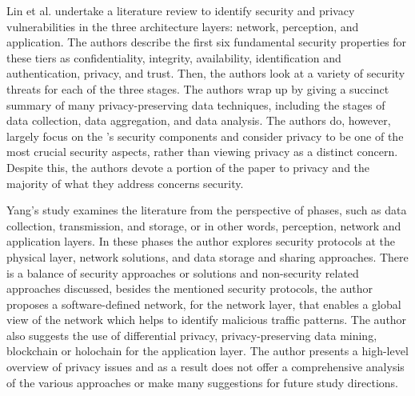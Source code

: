 Lin et al. \cite{LinSurvey} undertake a literature review to identify security
and privacy vulnerabilities in the three \hyperlink{\acronym}{\acronym} architecture layers: network,
perception, and application. The authors describe the first six fundamental
security properties for these tiers as confidentiality, integrity, availability,
identification and authentication, privacy, and trust. Then, the authors
look at a variety of security threats for each of the three stages. The
authors wrap up by giving a succinct summary of many privacy-preserving
data techniques, including the stages of data collection, data aggregation,
and data analysis. The authors do, however, largely focus on the \hyperlink{\acronym}{\acronym}'s security
components and consider privacy to be one of the most crucial security aspects,
rather than viewing privacy as a distinct concern. Despite this, the authors
devote a portion of the paper to privacy and the majority of what they address
concerns security.

Yang's study \cite{yang2022overview} examines the literature from the perspective
of \hyperlink{\acronym}{\acronym} phases, such as data collection, transmission, and storage, or in other
words, perception, network and application layers. In these phases the author explores
security protocols at the physical layer, network solutions, and data storage and
sharing approaches. There is a balance of security approaches or solutions and
non-security related approaches discussed, besides the mentioned security protocols,
the author proposes a software-defined network, for the network layer, that enables
a global view of the network which helps to identify malicious traffic patterns. The
author also suggests the use of differential privacy, privacy-preserving data mining,
blockchain or holochain for the application layer. The author presents a high-level
overview of privacy issues and as a result does not offer a comprehensive analysis of
the various approaches or make many suggestions for future study directions.

